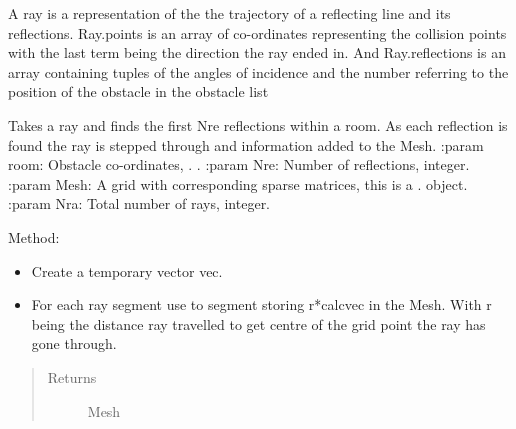 \documentclass[letterpaper,10pt,english]{sphinxmanual}
\begin{document}
\begin{fulllineitems}
\label{index:Rays.Ray}
A ray is a representation of the the trajectory of a reflecting   line and its reflections.
Ray.points is an array of co-ordinates representing
the collision points with the last term being the direction the ray ended in.
And Ray.reflections is an array containing tuples of the angles of incidence
and the number referring to the position of the obstacle in the obstacle list

\begin{fulllineitems}
\label{index:Rays.Ray.mesh_multiref}
Takes a ray and finds the first Nre reflections within a room.
As each reflection is found the ray is stepped through and
information added to the Mesh.
:param room: Obstacle co-ordinates, {\hyperref[index:module\string-Room]{}}. .
:param Nre: Number of reflections, integer.
:param Mesh: A grid with corresponding sparse matrices, this     is a {\hyperref[index:module\string-DictionarySparseMatrix]{}}.  object.
:param Nra: Total number of rays, integer.

Method:
\begin{itemize}
\item {} 
Create a temporary vector vec.

\item {} 
For each ray segment use      to      segment storing r*calcvec in the Mesh. With r being the distance      ray travelled to get  centre of the grid point the ray has gone      through.

\end{itemize}
\begin{quote}\begin{description}
\item[{Returns}] \leavevmode
Mesh

\end{description}\end{quote}

\end{fulllineitems}



\end{fulllineitems}
\end{document}

